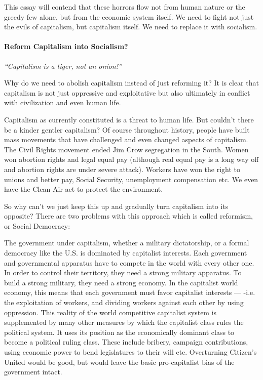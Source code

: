 This essay will contend that these horrors flow not from human nature or the greedy few alone, but from the economic system itself. We need to fight not just the evils of capitalism, but capitalism itself. We need to replace it with socialism.

\paragraph{Reform Capitalism into Socialism?}

\emph{“Capitalism is a tiger, not an onion!”}

Why do we need to abolish capitalism instead of just reforming it? It is clear that capitalism is not just oppressive and exploitative but also ultimately in conflict with civilization and even human life.

Capitalism as currently constituted is a threat to human life. But couldn’t there be a kinder gentler capitalism? Of course throughout history, people have built mass movements that have challenged and even changed aspects of capitalism. The Civil Rights movement ended Jim Crow segregation in the South. Women won abortion rights and legal equal pay (although real equal pay is a long way off and abortion rights are under severe attack). Workers have won the right to unions and better pay, Social Security, unemployment compensation etc. We even have the Clean Air act to protect the environment.

So why can’t we just keep this up and gradually turn capitalism into its opposite? There are two problems with this approach which is called reformism, or Social Democracy:

The government under capitalism, whether a military dictatorship, or a formal democracy like the U.S. is dominated by capitalist interests. Each government and governmental apparatus have to compete in the world with every other one. In order to control their territory, they need a strong military apparatus. To build a strong military, they need a strong economy. In the capitalist world economy, this means that each government must favor capitalist interests — -i.e. the exploitation of workers, and dividing workers against each other by using oppression. This reality of the world competitive capitalist system is supplemented by many other measures by which the capitalist class rules the political system. It uses its position as the economically dominant class to become a political ruling class. These include bribery, campaign contributions, using economic power to bend legislatures to their will etc. Overturning Citizen’s United would be good, but would leave the basic pro-capitalist bias of the government intact.

